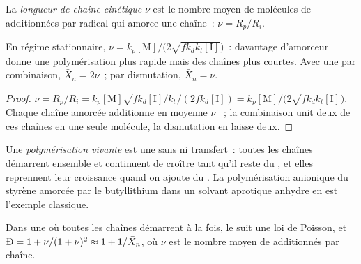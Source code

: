 \begin{definition}\label{def:b2:polymer-synthesis:chain-length}
La \emph{longueur de chaîne cinétique} $\nu$ est
le nombre moyen de molécules de  additionnées par radical qui amorce une chaîne~: $\nu = R_p/R_i$.
\end{definition}

\begin{proposition}\label{prop:b2:polymer-synthesis:chain-length}
En régime stationnaire, $\nu = k_p[\mathrm M]/\bigl(2\sqrt{fk_dk_t[\mathrm I]}\bigr)$~: davantage d'amorceur
donne une polymérisation plus rapide mais des chaînes plus courtes. Avec une  par combinaison,
$\bar X_n = 2\nu$~; par dismutation, $\bar X_n = \nu$.
\end{proposition}

\begin{proof}
$\nu = R_p/R_i = k_p[\mathrm M]\sqrt{fk_d[\mathrm I]/k_t}/(2fk_d[\mathrm I]) =
k_p[\mathrm M]/\bigl(2\sqrt{fk_dk_t[\mathrm I]}\bigr)$. Chaque chaîne amorcée additionne en moyenne $\nu$
~; la combinaison unit deux de ces chaînes en une seule molécule, la dismutation en laisse deux.
\end{proof}

\begin{definition}\label{def:b2:polymer-synthesis:living}
Une \emph{polymérisation vivante} est une
 sans  ni transfert~: toutes les chaînes démarrent ensemble et
continuent de croître tant qu'il reste du , et elles reprennent leur croissance quand on ajoute
du . La polymérisation anionique du styrène amorcée par le butyllithium dans un solvant aprotique
anhydre en est l'exemple classique.
\end{definition}

\begin{proposition}\label{prop:b2:polymer-synthesis:living}
Dans une  où toutes les chaînes démarrent à la fois, le 
suit une loi de Poisson, et $\text{\DH} = 1 + \nu/(1+\nu)^2 \approx 1 + 1/\bar X_n$, où $\nu$ est le
nombre moyen de  additionnés par chaîne.
\end{proposition}

